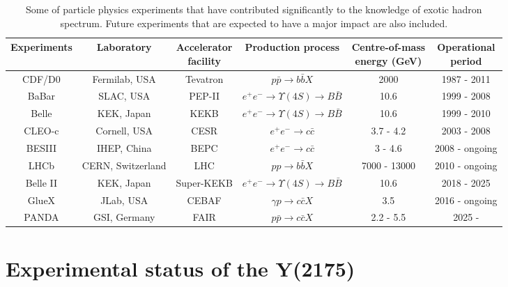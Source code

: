 \begin{landscape}
    \vspace*{\fill}   
\begin{table}[H]
    \centering
    \small
    \setlength{\tabcolsep}{3pt}
    \caption{Some of particle physics experiments that have contributed significantly to the knowledge of exotic hadron spectrum. Future experiments that are expected to have a major impact are also included.}
    \label{tab.1.3}
    \begin{tabular}{cccccc}
        \hline
        Experiments & Laboratory & \thead{Accelerator \\ facility} & Production process & \thead{Centre-of-mass\\energy (GeV)} & \thead{Operational \\ period} \\
        \hline
        CDF/D0 & Fermilab, USA & Tevatron & $p\bar{p} \rightarrow b\bar{b}X$ & 2000 & 1987 - 2011 \\
        BaBar & SLAC, USA & PEP-II & $e^{+}e^{-} \rightarrow \Upsilon(4S) \rightarrow B\bar{B}$ & 10.6 & 1999 - 2008 \\
        Belle & KEK, Japan & KEKB & $e^{+}e^{-} \rightarrow \Upsilon(4S) \rightarrow B\bar{B}$ & 10.6 & 1999 - 2010 \\
        CLEO-c & Cornell, USA & CESR & $e^{+}e^{-} \rightarrow c\bar{c}$ & 3.7 - 4.2 & 2003 - 2008 \\
        BESIII & IHEP, China & BEPC & $e^{+}e^{-} \rightarrow  c\bar{c}$ & 3 - 4.6 & 2008 - ongoing \\
        LHCb & CERN, Switzerland & LHC & $pp \rightarrow b\bar{b}X$ & 7000 - 13000 & 2010 - ongoing \\
        Belle II & KEK, Japan & Super-KEKB & $e^{+}e^{-} \rightarrow \Upsilon(4S) \rightarrow B\bar{B}$ & 10.6 & 2018 - 2025 \\
        GlueX & JLab, USA & CEBAF & $\gamma p \rightarrow c\bar{c} X$ & 3.5 & 2016 - ongoing \\
        PANDA & GSI, Germany & FAIR & $p\bar{p} \rightarrow c\bar{c} X$ & 2.2 - 5.5 & 2025 -  \\
        \hline
    \end{tabular}
\end{table}
\vspace*{\fill}
\end{landscape}

\section{Experimental status of the Y(2175)}
\label{p.1.4}

